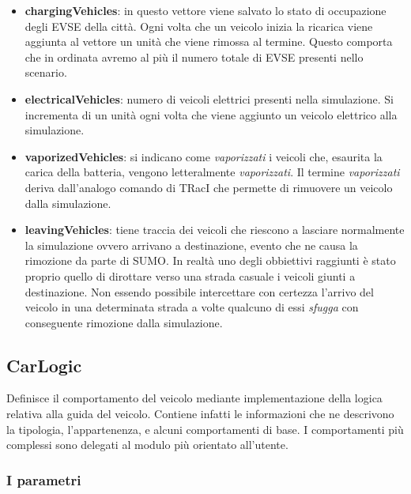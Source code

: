 \begin{itemize}
	\item \textbf{chargingVehicles}: in questo vettore viene salvato lo stato di occupazione degli EVSE della città. Ogni volta che un veicolo inizia la ricarica viene aggiunta al vettore un unità che viene rimossa al termine. Questo comporta che in ordinata avremo al più il numero totale di EVSE presenti nello scenario.
	\item \textbf{electricalVehicles}: numero di veicoli elettrici presenti nella simulazione. Si incrementa di un unità ogni volta che viene aggiunto un veicolo elettrico alla simulazione.
	\item \textbf{vaporizedVehicles}: si indicano come \emph{vaporizzati} i veicoli che, esaurita la carica della batteria, vengono letteralmente \emph{vaporizzati}. Il termine \emph{vaporizzati} deriva dall'analogo comando di TRacI che permette di rimuovere un veicolo dalla simulazione. 
	\item \textbf{leavingVehicles}: tiene traccia dei veicoli che riescono a lasciare normalmente la simulazione ovvero arrivano a destinazione, evento che ne causa la rimozione da parte di SUMO. In realtà uno degli obbiettivi raggiunti è stato proprio quello di dirottare verso una strada casuale i veicoli giunti a destinazione. Non essendo possibile intercettare con certezza l'arrivo del veicolo in una determinata strada a volte qualcuno di essi \emph{sfugga} con conseguente rimozione dalla simulazione.
\end{itemize}

\subsection{CarLogic}

Definisce il comportamento del veicolo mediante implementazione della logica relativa alla guida del veicolo. Contiene infatti le informazioni che ne descrivono la tipologia, l'appartenenza, e alcuni comportamenti di base. I comportamenti più complessi sono delegati al modulo  più orientato all'utente.

\subsubsection{I parametri}

